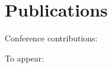 \chapter*{Publications}

\noindent
Conference contributions:
\begin{refsection}[ownpubs]
  \small%
  \nocite{*}
  \printbibliography[heading=none,type=inproceedings]
\end{refsection}

\noindent
To appear:
\begin{refsection}[ownpubs]
  \small%
  \nocite{*}
  \printbibliography[heading=none,type=misc]
\end{refsection}
